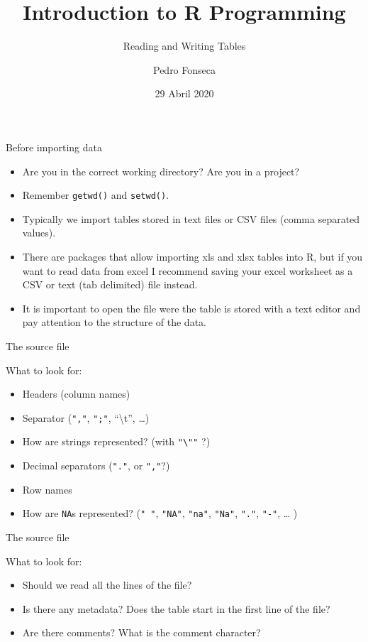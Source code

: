 \documentclass[ignorenonframetext,]{beamer}
\title{Introduction to R Programming}
\subtitle{Reading and Writing Tables}
\author{Pedro Fonseca}
\date{29 Abril 2020}
\begin{document}
\frame{\titlepage}

\begin{frame}[fragile]{Before importing data}
\protect\hypertarget{before-importing-data}{}

\begin{itemize}
\item
  Are you in the correct working directory? Are you in a project?
\item
  Remember \texttt{getwd()} and \texttt{setwd()}.
\item
  Typically we import tables stored in text files or CSV files (comma
  separated values).
\item
  There are packages that allow importing xls and xlsx tables into R,
  but if you want to read data from excel I recommend saving your excel
  worksheet as a CSV or text (tab delimited) file instead.
\item
  It is important to open the file were the table is stored with a text
  editor and pay attention to the structure of the data.
\end{itemize}

\end{frame}

\begin{frame}[fragile]{The source file}
\protect\hypertarget{the-source-file}{}

What to look for:

\begin{itemize}
\item
  Headers (column names)
\item
  Separator (\texttt{","}, \texttt{";"}, ``\textbackslash{}t'',
  \ldots{})
\item
  How are strings represented? (with \texttt{"\textbackslash{}""} ?)
\item
  Decimal separators (\texttt{"."}, or \texttt{","}?)
\item
  Row names
\item
  How are \texttt{NA}s represented? (\texttt{"\ "}, \texttt{"NA"},
  \texttt{"na"}, \texttt{"Na"}, \texttt{"."}, \texttt{"-"}, \ldots{} )
\end{itemize}

\end{frame}

\begin{frame}{The source file}
\protect\hypertarget{the-source-file-1}{}

What to look for:

\begin{itemize}
\item
  Should we read all the lines of the file?
\item
  Is there any metadata? Does the table start in the first line of the
  file?
\item
  Are there comments? What is the comment character?
\end{itemize}

\end{frame}
\end{document}
